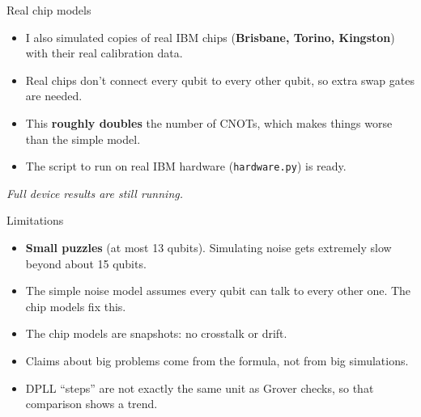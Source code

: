 \documentclass[aspectratio=169,11pt]{beamer}
\begin{document}
\begin{frame}{Real chip models}
\begin{itemize}
\item I also simulated copies of real IBM chips (\textbf{Brisbane, Torino, Kingston}) with their real calibration data.
\item Real chips don't connect every qubit to every other qubit, so extra swap gates are needed.
\item This \textbf{roughly doubles} the number of CNOTs, which makes things worse than the simple model.
\item The script to run on real IBM hardware (\texttt{hardware.py}) is ready.
\end{itemize}
\vspace{0.5em}
{\small\textit{Full device results are still running.}}
\end{frame}

\begin{frame}{Limitations}
\begin{itemize}
\item \textbf{Small puzzles} (at most 13 qubits). Simulating noise gets extremely slow beyond about 15 qubits.
\item The simple noise model assumes every qubit can talk to every other one. The chip models fix this.
\item The chip models are snapshots: no crosstalk or drift.
\item Claims about big problems come from the formula, not from big simulations.
\item DPLL ``steps'' are not exactly the same unit as Grover checks, so that comparison shows a trend.
\end{itemize}
\end{frame}
\end{document}
